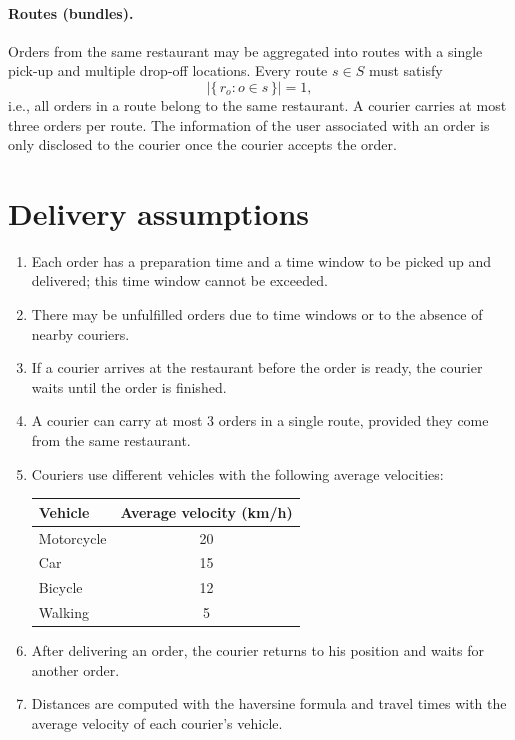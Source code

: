 \documentclass[11pt]{article}
\begin{document}
\paragraph{Routes (bundles).} Orders from the same restaurant may be aggregated
into routes with a single pick-up and multiple drop-off locations. Every route
$s \in S$ must satisfy
\begin{equation}
  \bigl|\{\, r_o : o \in s \,\}\bigr| = 1,
\end{equation}
i.e., all orders in a route belong to the same restaurant. A courier carries at
most three orders per route. The information of the user associated with an
order is only disclosed to the courier once the courier accepts the order.

\section{Delivery assumptions}

\begin{enumerate}[label=A\arabic*.]
  \item Each order has a preparation time and a time window to be picked up and
        delivered; this time window cannot be exceeded.
  \item There may be unfulfilled orders due to time windows or to the absence
        of nearby couriers.
  \item If a courier arrives at the restaurant before the order is ready, the
        courier waits until the order is finished.
  \item A courier can carry at most 3 orders in a single route, provided they
        come from the same restaurant.
  \item Couriers use different vehicles with the following average velocities:
        \begin{center}
        \begin{tabular}{@{}lc@{}}
          \toprule
          \textbf{Vehicle} & \textbf{Average velocity (km/h)} \\
          \midrule
          Motorcycle & 20 \\
          Car        & 15 \\
          Bicycle    & 12 \\
          Walking    & 5  \\
          \bottomrule
        \end{tabular}
        \end{center}
  \item After delivering an order, the courier returns to his position and
        waits for another order.
  \item Distances are computed with the haversine formula and travel times
        with the average velocity of each courier's vehicle.
\end{enumerate}
\end{document}
